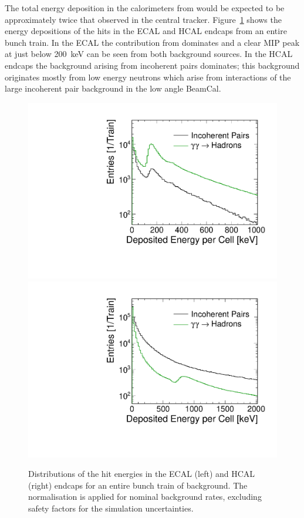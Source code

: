 The total energy deposition in the calorimeters from \gghadrons would be
expected to be approximately twice that observed in the central tracker. 
Figure~\ref{fig:chap3:caloBackEnergy} shows the energy depositions of the hits
in the \clicild ECAL and HCAL endcaps from an entire bunch train. In the ECAL
the contribution from \gghadrons dominates and a clear \acs{MIP} peak at just below
200~keV can be seen from both background sources. In the HCAL endcaps the
background arising from incoherent pairs dominates; this background originates 
mostly from low energy neutrons which arise from
interactions of the large incoherent pair background in the low angle BeamCal. 


\begin{figure}[hbt]
\centering
\includegraphics[width=0.49\linewidth]{../Chap3_ExpCond_PhysPerfsReqs/ECalEnergyGandPMacro.pdf}
\includegraphics[width=0.49\linewidth]{../Chap3_ExpCond_PhysPerfsReqs/HCalEnergyGandPMacro.pdf}
 \caption{Distributions of the hit energies in the \clicild ECAL
   (left) and HCAL (right) endcaps for an entire bunch train of
   background. The normalisation is applied for nominal background
   rates, excluding safety factors for the simulation uncertainties.
 \label{fig:chap3:caloBackEnergy}}

\end{figure}



